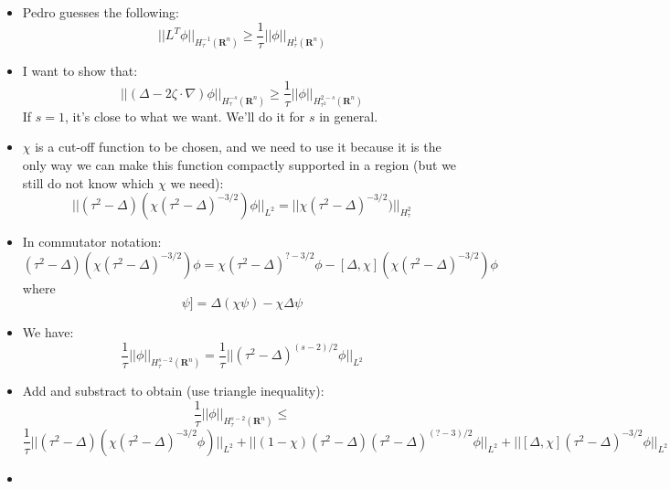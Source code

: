 \documentclass{article}
\begin{document}
\begin{itemize}
    \item Pedro guesses the following:
    \begin{equation}
        || L^T\phi||_{H^{-1}_\tau(\mathbf{R}^n)} \geq \frac{1}{\tau}||\phi||_{H^1_\tau(\mathbf{R}^n)}
    \end{equation}

    \item I want to show that:
    \begin{equation}
        ||  (\Delta - 2 \zeta \cdot \nabla) \phi ||_{H^{-s}_\tau(\mathbf{R}^n)} \geq \frac{1}{\tau} ||\phi||_{H_{\tau^2}^{2-s} (\mathbf{R}^n)}
    \end{equation}
    If $s=1$, it's close to what we want. We'll do it for $s$ in general. 

    \item $\chi$ is a cut-off function to be chosen, and we need to use it because it is the only way we can make this function compactly supported in a region (but we still do not know which $\chi$ we need):
    \begin{equation}
        || (\tau^2 - \Delta)(\chi(\tau^2 - \Delta)^{-3/2}) \phi||_{L^2} = ||\chi (\tau^2 - \Delta)^{-3/2})||_{H^2_\tau}
    \end{equation}

    \item In commutator notation:
    \begin{equation}
        (\tau^2 - \Delta)(\chi(\tau^2 - \Delta)^{-3/2}) \phi = \chi (\tau^2 - \Delta)^{?-3/2}\phi - [\Delta, \chi](\chi(\tau^2 - \Delta)^{-3/2}) \phi
    \end{equation}
    where
    \begin{equation}
        [\Delta, x] \psi] = \Delta (\chi \psi) - \chi \Delta \psi
    \end{equation}

    \item We have:
    \begin{equation}
        \frac{1}{\tau} || \phi ||_{H^{s-2}_\tau(\mathbf{R}^n)} = \frac{1}{\tau} ||(\tau^2 - \Delta)^{(s-2)/2} \phi||_{L^2}
    \end{equation}

    \item Add and substract to obtain (use triangle inequality):
    \begin{equation}
        \frac{1}{\tau} || \phi ||_{H^{s-2}_\tau(\mathbf{R}^n)} \leq 
    \end{equation}
    \begin{equation}
        \frac{1}{\tau} ||(\tau^2 - \Delta) (\chi(\tau^2 -\Delta)^{-3/2} \phi)||_{L^2} + || (1 - \chi)(\tau^2 - \Delta) (\tau^2 -\Delta)^{(?-3)/2} \phi||_{L^2} + ||[\Delta, \chi] (\tau^2 -\Delta)^{-3/2} \phi||_{L^2}
    \end{equation}

    \item 
    
\end{itemize}
\end{document}
